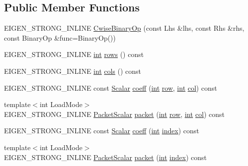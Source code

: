\subsection*{Public Member Functions}
\begin{DoxyCompactItemize}
\item 
E\-I\-G\-E\-N\-\_\-\-S\-T\-R\-O\-N\-G\-\_\-\-I\-N\-L\-I\-N\-E \hyperlink{class_cwise_binary_op_ad5f0ccc1a30b5704f7dd7345ae6cff86}{Cwise\-Binary\-Op} (const Lhs \&lhs, const Rhs \&rhs, const Binary\-Op \&func=Binary\-Op())
\item 
E\-I\-G\-E\-N\-\_\-\-S\-T\-R\-O\-N\-G\-\_\-\-I\-N\-L\-I\-N\-E \hyperlink{ioapi_8h_a787fa3cf048117ba7123753c1e74fcd6}{int} \hyperlink{class_cwise_binary_op_a926a2f626f566d6be0b23825ce95271d}{rows} () const 
\item 
E\-I\-G\-E\-N\-\_\-\-S\-T\-R\-O\-N\-G\-\_\-\-I\-N\-L\-I\-N\-E \hyperlink{ioapi_8h_a787fa3cf048117ba7123753c1e74fcd6}{int} \hyperlink{class_cwise_binary_op_a1a1558e58452433e14b2e7592a714da5}{cols} () const 
\item 
E\-I\-G\-E\-N\-\_\-\-S\-T\-R\-O\-N\-G\-\_\-\-I\-N\-L\-I\-N\-E const \hyperlink{class_matrix_base_a625df8339dc2d816cbc0fd66e7dadaf5}{Scalar} \hyperlink{class_cwise_binary_op_a3b080aaa15d10aeed388c11b3789dd39}{coeff} (\hyperlink{ioapi_8h_a787fa3cf048117ba7123753c1e74fcd6}{int} \hyperlink{glext_8h_a11b277b422822f784ee248b43eee3e1e}{row}, \hyperlink{ioapi_8h_a787fa3cf048117ba7123753c1e74fcd6}{int} \hyperlink{class_matrix_base_ae3c94b0f25b4273c7a8125169bdf60e0}{col}) const 
\item 
{\footnotesize template$<$int Load\-Mode$>$ }\\E\-I\-G\-E\-N\-\_\-\-S\-T\-R\-O\-N\-G\-\_\-\-I\-N\-L\-I\-N\-E \hyperlink{class_matrix_base_a58f32cd6a06433ee7a60efa03e99183a}{Packet\-Scalar} \hyperlink{class_cwise_binary_op_a16bd97edf3b9ad39ced18be824561549}{packet} (\hyperlink{ioapi_8h_a787fa3cf048117ba7123753c1e74fcd6}{int} \hyperlink{glext_8h_a11b277b422822f784ee248b43eee3e1e}{row}, \hyperlink{ioapi_8h_a787fa3cf048117ba7123753c1e74fcd6}{int} \hyperlink{class_matrix_base_ae3c94b0f25b4273c7a8125169bdf60e0}{col}) const 
\item 
E\-I\-G\-E\-N\-\_\-\-S\-T\-R\-O\-N\-G\-\_\-\-I\-N\-L\-I\-N\-E const \hyperlink{class_matrix_base_a625df8339dc2d816cbc0fd66e7dadaf5}{Scalar} \hyperlink{class_cwise_binary_op_a2031cba8115c00873ac3b917178ebb43}{coeff} (\hyperlink{ioapi_8h_a787fa3cf048117ba7123753c1e74fcd6}{int} \hyperlink{glext_8h_ab47dd9958bcadea08866b42bf358e95e}{index}) const 
\item 
{\footnotesize template$<$int Load\-Mode$>$ }\\E\-I\-G\-E\-N\-\_\-\-S\-T\-R\-O\-N\-G\-\_\-\-I\-N\-L\-I\-N\-E \hyperlink{class_matrix_base_a58f32cd6a06433ee7a60efa03e99183a}{Packet\-Scalar} \hyperlink{class_cwise_binary_op_a98088fc3e1d6a105c05622fcaf2d6c7f}{packet} (\hyperlink{ioapi_8h_a787fa3cf048117ba7123753c1e74fcd6}{int} \hyperlink{glext_8h_ab47dd9958bcadea08866b42bf358e95e}{index}) const 
\end{DoxyCompactItemize}

